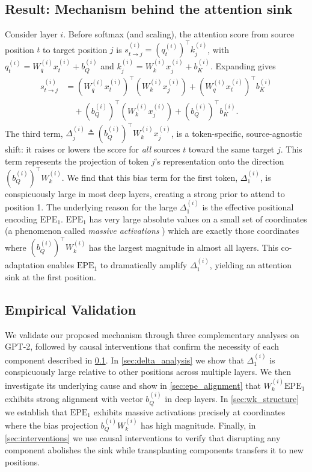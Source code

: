 \documentclass[11pt]{article}
\newif\ifYRMcomments
\newif\ifBacklogcomments
\newcommand{\YRM}[1]{\ifYRMcomments\textcolor{red}{[YRM: #1]}\fi}
\newcommand{\Backlog}[1]{\ifBacklogcomments\textcolor{blue}{[Backlog: #1]}\fi}
\begin{document}
\subsection{Result: Mechanism behind the attention sink}\label{sec:mechanism}
Consider layer $i$. Before softmax (and scaling), the attention score from source position $t$ to target position $j$ is $s_{t\to j}^{(i)} = (q_t^{(i)})^\top k_j^{(i)}$, with $q_t^{(i)} = W_q^{(i)} x_t^{(i)} + b_Q^{(i)}$ and $k_j^{(i)} = W_k^{(i)} x_j^{(i)} + b_K^{(i)}$. Expanding gives
\[
\begin{aligned}
s_{t\to j}^{(i)} &= (W_q^{(i)} x_t^{(i)})^\top (W_k^{(i)} x_j^{(i)}) + (W_q^{(i)} x_t^{(i)})^\top b_K^{(i)} \\
&\quad + (b_Q^{(i)})^\top (W_k^{(i)} x_j^{(i)}) + (b_Q^{(i)})^\top b_K^{(i)}.
\end{aligned}
\]
The third term, $\Delta_j^{(i)} \triangleq (b_Q^{(i)})^\top W_k^{(i)} x_j^{(i)}$, is a token-specific, source-agnostic shift: it raises or lowers the score for \emph{all} sources $t$ toward the same target $j$. This term represents the projection of token $j$'s representation onto the direction $(b_Q^{(i)})^\top W_k^{(i)}$. We find that this bias term for the first token, $\Delta_1^{(i)}$, is conspicuously large in most deep layers, creating a strong prior to attend to position 1. The underlying reason for the large $\Delta_1^{(i)}$ is the effective positional encoding $\mathrm{EPE}_1$. $\mathrm{EPE}_1$ has very large absolute values on a small set of coordinates (a phenomenon called \textit{massive activations} \YRM{Cite main paper introducing this}) which are exactly those coordinates where $(b_Q^{(i)})^\top W_k^{(i)}$ has the largest magnitude in almost all layers. This co-adaptation enables $\mathrm{EPE}_1$ to dramatically amplify $\Delta_1^{(i)}$, yielding an attention sink at the first position. \Backlog{Can we add a diagram to illustrate this? This sounds time consuming but really really helpful since this passage turned out to be somewhat dense. Let's wait to see how much space we have before doing this}

\subsection{Empirical Validation}
We validate our proposed mechanism through three complementary analyses on GPT-2, followed by causal interventions that confirm the necessity of each component described in \cref{sec:mechanism}. In \cref{sec:delta_analysis} we show that $\Delta_1^{(i)}$ is conspicuously large relative to other positions across multiple layers. We then investigate its underlying cause and show in \cref{sec:epe_alignment} that $W_k^{(i)}\mathrm{EPE}_1$ exhibits strong alignment with vector $b_Q^{(i)}$ in deep layers. In \cref{sec:wk_structure} we establish that $\mathrm{EPE}_1$ exhibits massive activations precisely at coordinates where the bias projection $b_Q^{(i)} W_k^{(i)}$ has high magnitude. Finally, in \cref{sec:interventions} we use causal interventions to verify that disrupting any component abolishes the sink while transplanting components transfers it to new positions.
\end{document}
